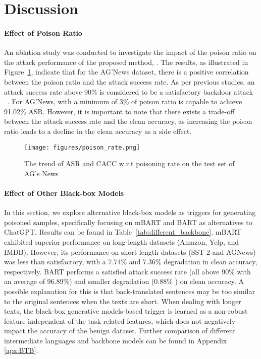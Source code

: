 \section{Discussion}\label{sec:discussion}

\paragraph{Effect of Poison Ratio}
An ablation study was conducted to investigate the impact of the poison ratio on the attack performance of the proposed method, \method. The results, as illustrated in Figure~\ref{fig:RATE}, indicate that for the AG'News dataset, there is a positive correlation between the poison ratio and the attack success rate. As per previous studies, an attack success rate above 90\% is considered to be a satisfactory backdoor attack ~\cite{li2021bfclass}. For AG'News, with a minimum of 3\% of poison ratio is capable to achieve 91.02\% ASR. However, it is important to note that there exists a trade-off between the attack success rate and the clean accuracy, as increasing the poison ratio leads to a decline in the clean accuracy as a side effect.
\begin{figure}[h]
    \centering %
\texttt{[image: figures/poison\_rate.png]}
  \caption{The trend of ASR and CACC w.r.t poisoning rate on the test set of AG's News}
\label{fig:RATE}
\end{figure}

\paragraph{Effect of Other Black-box Models}\label{sec:effect_backbone}
In this section, we explore alternative black-box models as triggers for generating poisoned samples, specifically focusing on mBART and BART as alternatives to ChatGPT. Results can be found in Table~\ref{tab:different_backbone}.
mBART exhibited superior performance on long-length datasets (Amazon, Yelp, and IMDB). However, its performance on short-length datasets (SST-2 and AGNews) was less than satisfactory, with a 7.74\% and 7.36\% degradation in clean accuracy, respectively. BART performs a satisfied attack success rate (all above 90\% with an average of 96.89\%) and smaller degradation (0.88\% ) on clean accuracy. 
A possible explanation for this is that back-translated sentences may be too similar to the original sentences when the texts are short. When dealing with longer texts, the black-box generative models-based trigger is learned as a non-robust feature independent of the task-related features, which does not negatively impact the accuracy of the benign dataset. Further comparison of different intermediate languages and backbone models can be found in Appendix~ \ref{apx:BTB}. 

